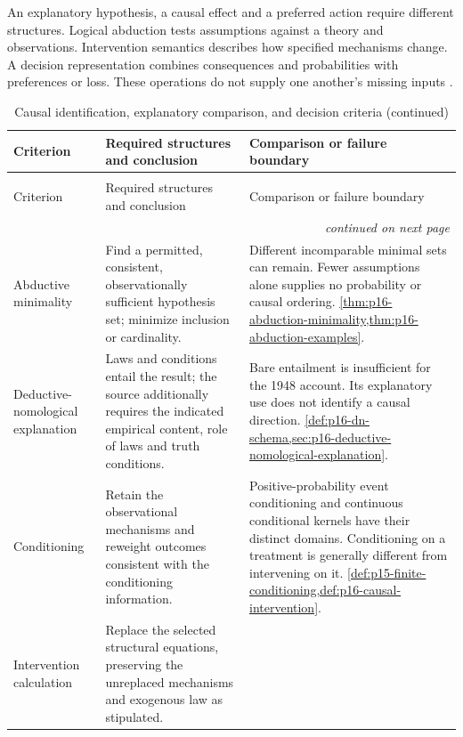 An explanatory hypothesis, a causal effect and a preferred action require
different structures. Logical abduction tests assumptions against a theory
and observations. Intervention semantics describes how specified mechanisms
change. A decision representation combines consequences and probabilities
with preferences or loss. These operations do not supply one another's
missing inputs \cite{EiterGottlobAbductionManuscript,Pearl2009CausalOverview,
Rubinstein2015LectureNotes}.

\begin{longtable}{@{}p{}p{}p{}@{}}
\caption{Causal identification, explanatory comparison, and decision criteria}\\
\toprule
Criterion & Required structures and conclusion & Comparison or failure boundary \\
\midrule
\endfirsthead
\caption[]{Causal identification, explanatory comparison, and decision criteria (continued)}\\
\toprule
Criterion & Required structures and conclusion & Comparison or failure boundary \\
\midrule
\endhead
\midrule\multicolumn{3}{r}{\emph{continued on next page}}\\
\endfoot
\endlastfoot
Abductive minimality & Find a permitted, consistent, observationally
sufficient hypothesis set; minimize inclusion or cardinality. & Different
incomparable minimal sets can remain. Fewer assumptions alone supplies no
probability or causal ordering.
\cref{thm:p16-abduction-minimality,thm:p16-abduction-examples}. \\
Deductive-nomological explanation & Laws and conditions entail the result;
the source additionally requires the indicated empirical content, role of
laws and truth conditions. & Bare entailment is insufficient for the
1948 account. Its explanatory use does not identify a causal direction.
\cref{def:p16-dn-schema,sec:p16-deductive-nomological-explanation}. \\
Conditioning & Retain the observational mechanisms and reweight outcomes
consistent with the conditioning information. & Positive-probability event
conditioning and continuous conditional kernels have their distinct domains.
Conditioning on a treatment is generally different from intervening on it.
\cref{def:p15-finite-conditioning,def:p16-causal-intervention}. \\
Intervention calculation & Replace the selected structural equations,
preserving the unreplaced mechanisms and exogenous law as stipulated. &

\end{longtable}
